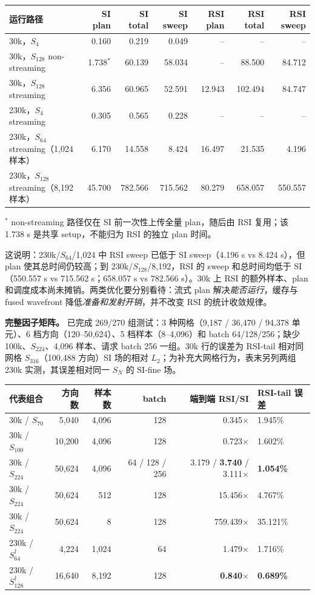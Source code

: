 \documentclass[11pt,a4paper]{article}
\begin{document}
\begin{tabularx}{\linewidth}{@{}lrrrrrr@{}}
\toprule
运行路径 & SI plan & SI total & SI sweep & RSI plan & RSI total & RSI sweep\\
\midrule
30k，$S_4$ & 0.160 & 0.219 & 0.049 & -- & -- & --\\
30k，$S_{128}$ non-streaming & 1.738$^*$ & 60.139 & 58.034 & -- & 88.500 & 84.712\\
30k，$S_{128}$ streaming & 6.356 & 60.965 & 52.591 & 12.943 & 102.494 & 84.747\\
230k，$S_4$ streaming & 0.305 & 0.565 & 0.228 & -- & -- & --\\
230k，$S_{64}$ streaming（1,024 样本） & 6.170 & 14.558 & 8.424 & 16.497 & 21.535 & 4.196\\
230k，$S_{128}$ streaming（8,192 样本） & 45.700 & 782.566 & 715.562 & 80.279 & 658.057 & 550.557\\
\bottomrule
\end{tabularx}

\footnotesize $^*$ non-streaming 路径仅在 SI 前一次性上传全量 plan，随后由 RSI 复用；该 1.738 s 是共享 setup，不能归为 RSI 的独立 plan 时间。\normalsize

这说明：230k/$S_{64}$/1,024 中 RSI sweep 已低于 SI sweep（4.196 s vs 8.424 s），但 plan 使其总时间仍较高；到 230k/$S_{128}$/8,192，RSI 的 sweep 和总时间均低于 SI（550.557 s vs 715.562 s；658.057 s vs 782.566 s）。30k 上 RSI 的额外样本、plan 和调度成本尚未摊销。两类优化要分别看待：流式 plan 解决\textit{能否运行}，缓存与 fused wavefront 降低\textit{准备和发射开销}，并不改变 RSI 的统计收敛规律。

\textbf{完整因子矩阵。} 已完成 269/270 组测试：3 种网格（9,187 / 36,470 / 94,378 单元）、6 档方向（120--50,624）、5 档样本（8--4,096）和 batch 64/128/256；缺少 100k、$S_{224}$、4,096 样本、请求 batch 256 一组。30k 行的误差为 RSI-tail 相对同网格 $S_{316}$（100,488 方向）SI 场的相对 $L_2$；为补充大网格行为，表末另列两组 230k 实测，其误差相对同一 $S_N$ 的 SI-fine 场。

\begin{tabularx}{\linewidth}{@{}lrrrrY@{}}
\toprule
代表组合 & 方向数 & 样本数 & batch & 端到端 RSI/SI & RSI-tail 误差\\
\midrule
30k / $S_{70}$ & 5,040 & 4,096 & 128 & 0.345$\times$ & 1.945\%\\
30k / $S_{100}$ & 10,200 & 4,096 & 128 & 0.723$\times$ & 1.602\%\\
30k / $S_{224}$ & 50,624 & 4,096 & 64 / 128 / 256 & 3.179 / \textbf{3.740} / 3.111$\times$ & \textbf{1.054\%}\\
30k / $S_{224}$ & 50,624 & 512 & 128 & 15.456$\times$ & 4.767\%\\
30k / $S_{224}$ & 50,624 & 8 & 128 & 759.439$\times$ & 35.121\%\\
230k / $S_{64}^\dagger$ & 4,224 & 1,024 & 64 & 1.479$\times$ & 1.716\%\\
230k / $S_{128}^\dagger$ & 16,640 & 8,192 & 128 & \textbf{0.840}$\times$ & \textbf{0.689\%}\\
\bottomrule
\end{tabularx}
\end{document}
